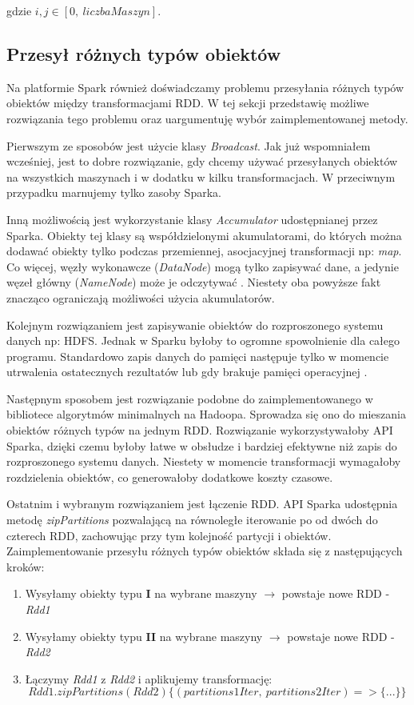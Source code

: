 \documentclass[licencjacka]{pracamgr}
\begin{document}
gdzie \(i, j \in [0, \ liczbaMaszyn]\).

\subsection{Przesył różnych typów obiektów}

Na platformie Spark również doświadczamy problemu przesyłania różnych typów obiektów między transformacjami RDD. W tej sekcji przedstawię możliwe rozwiązania tego problemu oraz uargumentuję wybór zaimplementowanej metody.

Pierwszym ze sposobów jest użycie klasy \textit{Broadcast}. Jak już wspomniałem wcześniej, jest to dobre rozwiązanie, gdy chcemy używać przesyłanych obiektów na wszystkich maszynach i w dodatku w kilku transformacjach. W przeciwnym przypadku marnujemy tylko zasoby Sparka.

Inną możliwością jest wykorzystanie klasy \textit{Accumulator} udostępnianej przez Sparka. Obiekty tej klasy są współdzielonymi akumulatorami, do których można dodawać obiekty tylko podczas przemiennej, asocjacyjnej transformacji np: \textit{map}. Co więcej, węzły wykonawcze (\textit{DataNode}) mogą tylko zapisywać dane, a jedynie węzeł główny (\textit{NameNode}) może je odczytywać \cite{spark_documentation}. Niestety oba powyższe fakt znacząco ograniczają możliwości użycia akumulatorów.

Kolejnym rozwiązaniem jest zapisywanie obiektów do rozproszonego systemu danych np: HDFS. Jednak w Sparku byłoby to ogromne spowolnienie dla całego programu. Standardowo zapis danych do pamięci następuje tylko w momencie utrwalenia ostatecznych rezultatów lub gdy brakuje pamięci operacyjnej \cite{zaharia2010spark}.

Następnym sposobem jest rozwiązanie podobne do zaimplementowanego w bibliotece algorytmów minimalnych na Hadoopa. Sprowadza się ono do mieszania obiektów różnych typów na jednym RDD. Rozwiązanie wykorzystywałoby API Sparka, dzięki czemu byłoby łatwe w obsłudze i bardziej efektywne niż zapis do rozproszonego systemu danych. Niestety w momencie transformacji wymagałoby rozdzielenia obiektów, co generowałoby dodatkowe koszty czasowe.

Ostatnim i wybranym rozwiązaniem jest łączenie RDD. API Sparka udostępnia metodę \textit{zipPartitions} pozwalającą na równoległe iterowanie po od dwóch do czterech RDD, zachowując przy tym kolejność partycji i obiektów. Zaimplementowanie przesyłu różnych typów obiektów składa się z następujących kroków:
\begin{enumerate}
    \item Wysyłamy obiekty typu \textbf{I} na wybrane maszyny $\rightarrow$ powstaje nowe RDD - \textit{Rdd1}
    \item Wysyłamy obiekty typu \textbf{II} na wybrane maszyny $\rightarrow$ powstaje nowe RDD - \textit{Rdd2}
    \item Łączymy \textit{Rdd1} z \textit{Rdd2} i aplikujemy transformację:
    $$Rdd1.zipPartitions(Rdd2)\{(partitions1Iter, \ partitions2Iter) => \{ ... \}\}$$
\end{enumerate}
\end{document}
